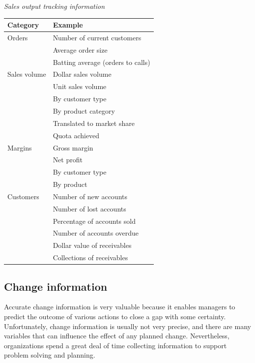 \documentclass[
]{article}
\begin{document}
\emph{Sales output tracking information}

\begin{longtable}[]{@{}
  >{\raggedright\arraybackslash}p{}
  >{\raggedright\arraybackslash}p{}@{}}
\toprule
Category & Example \\
\midrule
\endhead
Orders & Number of current customers \\
& Average order size \\
& Batting average (orders to calls) \\
Sales volume & Dollar sales volume \\
& Unit sales volume \\
& By customer type \\
& By product category \\
& Translated to market share \\
& Quota achieved \\
Margins & Gross margin \\
& Net profit \\
& By customer type \\
& By product \\
Customers & Number of new accounts \\
& Number of lost accounts \\
& Percentage of accounts sold \\
& Number of accounts overdue \\
& Dollar value of receivables \\
& Collections of receivables \\
\bottomrule
\end{longtable}

\hypertarget{change-information}{%
\subsection*{Change information}\label{change-information}}

Accurate change information is very valuable because it enables managers
to predict the outcome of various actions to close a gap with some
certainty. Unfortunately, change information is usually not very
precise, and there are many variables that can influence the effect of
any planned change. Nevertheless, organizations spend a great deal of
time collecting information to support problem solving and planning.
\end{document}
